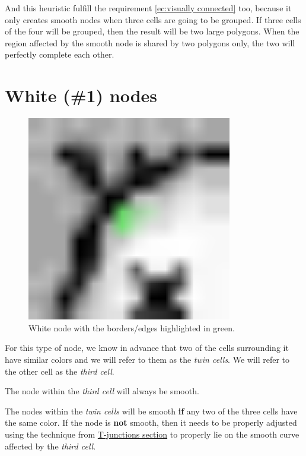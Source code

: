 And this heuristic fulfill the requirement \ref{ec:visually connected} too,
because it only creates smooth nodes when three cells are going to be grouped.
If three cells of the four will be grouped, then the result will be two large
polygons. When the region affected by the smooth node is shared by two polygons
only, the two will perfectly complete each other.

\section{White (\#1) nodes}
\label{white_nodes}

\begin{figure}[H]
  \centering
  \includegraphics[width=0.8\textwidth]{assets/boof_white.pdf}
  \caption{White node with the borders/edges highlighted in green.}
\end{figure}

For this type of node, we know in advance that two of the cells surrounding it
have similar colors and we will refer to them as the \emph{twin cells}. We will
refer to the other cell as the \emph{third cell}.

The node within the \emph{third cell} will always be smooth.

The nodes within the \emph{twin cells} will be smooth \textbf{if} any two of the
three cells have the same color. If the node is \textbf{not} smooth, then it
needs to be properly adjusted using the technique from
\hyperref[tjunction]{T-junctions section} to properly lie on the smooth curve
affected by the \emph{third cell}.

